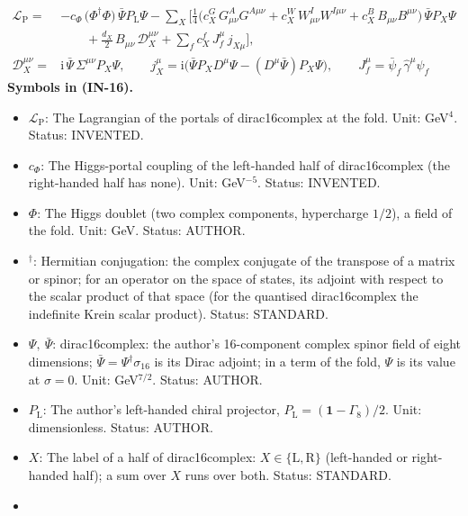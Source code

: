 \documentclass[
  10pt,
]{article}
\providecommand{\tightlist}{%
  \setlength{\itemsep}{0pt}\setlength{\parskip}{0pt}}
\begin{document}
\[
\begin{aligned}
\mathcal{L}_{\mathrm{P}} = {}&-c_\Phi\,\big(\Phi^\dagger\Phi\big)\,\bar\Psi P_{\mathrm{L}}\Psi
 - \sum_{X}\Big[\frac14\big(c^{G}_X\,G^A_{\mu\nu}G^{A\mu\nu} + c^{W}_X\,W^I_{\mu\nu}W^{I\mu\nu}
 + c^{B}_X\,B_{\mu\nu}B^{\mu\nu}\big)\,\bar\Psi P_X\Psi\\
&\qquad + \frac{d_X}{2}\,B_{\mu\nu}\,\mathcal{D}_X^{\mu\nu} + \sum_{f} c^{f}_X\,J_f^\mu\,j_{X\mu}\Big],\\
\mathcal{D}_X^{\mu\nu} = {}&\mathrm{i}\,\bar\Psi\,\Sigma^{\mu\nu}P_X\Psi,\qquad
j_X^\mu = \mathrm{i}\big(\bar\Psi P_X D^\mu\Psi - (D^\mu\bar\Psi)P_X\Psi\big),\qquad
J_f^\mu = \bar\psi_f\,\hat\gamma^\mu\psi_f
\end{aligned} \tag{IN-16}
\] \textbf{Symbols in (IN-16).}

\begin{itemize}
\tightlist
\item
  \(\mathcal{L}_{\mathrm{P}}\): The Lagrangian of the portals of
  dirac16complex at the fold. Unit: GeV\(^4\). Status: INVENTED.
\item
  \(c_\Phi\): The Higgs-portal coupling of the left-handed half of
  dirac16complex (the right-handed half has none). Unit: GeV\(^{-5}\).
  Status: INVENTED.
\item
  \(\Phi\): The Higgs doublet (two complex components, hypercharge
  \(1/2\)), a field of the fold. Unit: GeV. Status: AUTHOR.
\item
  \({}^\dagger\): Hermitian conjugation: the complex conjugate of the
  transpose of a matrix or spinor; for an operator on the space of
  states, its adjoint with respect to the scalar product of that space
  (for the quantised dirac16complex the indefinite Krein scalar
  product). Status: STANDARD.
\item
  \(\Psi,\ \bar\Psi\): dirac16complex: the author's 16-component complex
  spinor field of eight dimensions;
  \(\bar\Psi = \Psi^\dagger\sigma_{16}\) is its Dirac adjoint; in a term
  of the fold, \(\Psi\) is its value at \(\sigma = 0\). Unit:
  GeV\(^{7/2}\). Status: AUTHOR.
\item
  \(P_{\mathrm{L}}\): The author's left-handed chiral projector,
  \(P_{\mathrm{L}} = (\mathbf{1} - \Gamma_8)/2\). Unit: dimensionless.
  Status: AUTHOR.
\item
  \(X\): The label of a half of dirac16complex:
  \(X \in \{\mathrm{L}, \mathrm{R}\}\) (left-handed or right-handed
  half); a sum over \(X\) runs over both. Status: STANDARD.
\item

\end{itemize}
\end{document}
